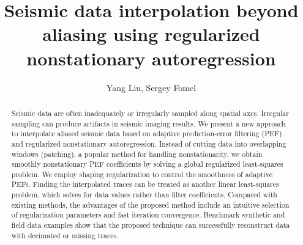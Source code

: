 
\title{Seismic data interpolation beyond aliasing using regularized nonstationary autoregression}

\renewcommand{\thefootnote}{\fnsymbol{footnote}}


\address{
\footnotemark[1] College of Geo-exploration Science and Technology,\\
Jilin University \\
No.6 Xi minzhu street, \\
Changchun, China, 130026 \\
\footnotemark[2] Bureau of Economic Geology,\\
John A. and Katherine G. Jackson School of Geosciences \\
The University of Texas at Austin \\
University Station, Box X \\
Austin, TX, USA, 78713-8924}

\author{Yang Liu\footnotemark[1], Sergey Fomel\footnotemark[2]}

\maketitle

\begin{abstract}
Seismic data are often inadequately or irregularly sampled along
spatial axes. Irregular sampling can produce
artifacts in seismic imaging results. We present a new approach to
interpolate aliased seismic data based on adaptive prediction-error
filtering (PEF) and regularized nonstationary autoregression. Instead
of cutting data into overlapping windows (patching), a popular method
for handling nonstationarity, we obtain smoothly nonstationary PEF
coefficients by solving a global regularized least-squares
problem. We employ shaping regularization to
control the smoothness of adaptive PEFs. Finding the interpolated
traces can be treated as another linear least-squares problem, which
solves for data values rather than filter coefficients. Compared with
existing methods, the advantages of the proposed method include an
intuitive selection of regularization parameters and fast
iteration convergence. Benchmark synthetic and
field data examples show that the proposed technique can successfully
reconstruct data with decimated or missing traces.

\end{abstract}

